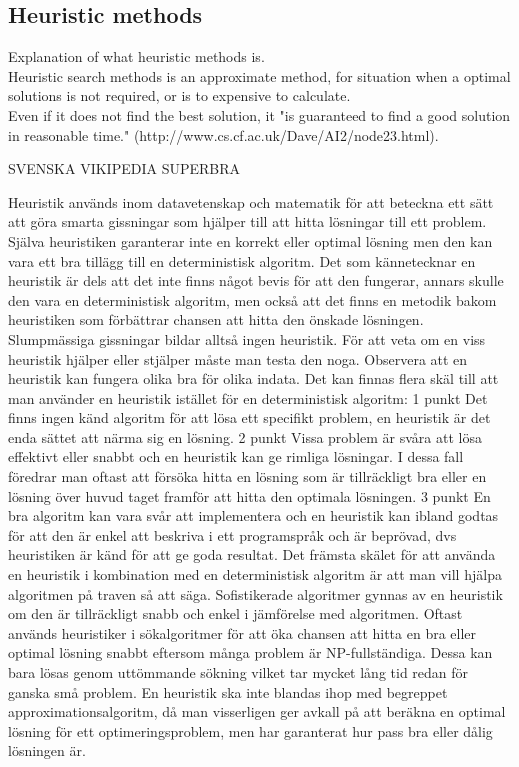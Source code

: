 \subsection{Heuristic methods}

Explanation of what heuristic methods is.\\
Heuristic search methods is an approximate method, for situation when a optimal solutions is not required, or is to expensive to calculate. \\Even if it does not find the best solution, it "is guaranteed to find a good solution in reasonable time." (http://www.cs.cf.ac.uk/Dave/AI2/node23.html).

SVENSKA VIKIPEDIA SUPERBRA

Heuristik används inom datavetenskap och matematik för att beteckna ett sätt att göra smarta gissningar som hjälper till att hitta lösningar till ett problem. Själva heuristiken garanterar inte en korrekt eller optimal lösning men den kan vara ett bra tillägg till en deterministisk algoritm.
Det som kännetecknar en heuristik är dels att det inte finns något bevis för att den fungerar, annars skulle den vara en deterministisk algoritm, men också att det finns en metodik bakom heuristiken som förbättrar chansen att hitta den önskade lösningen. Slumpmässiga gissningar bildar alltså ingen heuristik. För att veta om en viss heuristik hjälper eller stjälper måste man testa den noga. Observera att en heuristik kan fungera olika bra för olika indata.
Det kan finnas flera skäl till att man använder en heuristik istället för en deterministisk algoritm:
1 punkt Det finns ingen känd algoritm för att lösa ett specifikt problem, en heuristik är det enda sättet att närma sig en lösning.
2 punkt Vissa problem är svåra att lösa effektivt eller snabbt och en heuristik kan ge rimliga lösningar. I dessa fall föredrar man oftast att försöka hitta en lösning som är tillräckligt bra eller en lösning över huvud taget framför att hitta den optimala lösningen.
3 punkt En bra algoritm kan vara svår att implementera och en heuristik kan ibland godtas för att den är enkel att beskriva i ett programspråk och är beprövad, dvs heuristiken är känd för att ge goda resultat.
Det främsta skälet för att använda en heuristik i kombination med en deterministisk algoritm är att man vill hjälpa algoritmen på traven så att säga. Sofistikerade algoritmer gynnas av en heuristik om den är tillräckligt snabb och enkel i jämförelse med algoritmen. Oftast används heuristiker i sökalgoritmer för att öka chansen att hitta en bra eller optimal lösning snabbt eftersom många problem är NP-fullständiga. Dessa kan bara lösas genom uttömmande sökning vilket tar mycket lång tid redan för ganska små problem.
En heuristik ska inte blandas ihop med begreppet approximationsalgoritm, då man visserligen ger avkall på att beräkna en optimal lösning för ett optimeringsproblem, men har garanterat hur pass bra eller dålig lösningen är.
